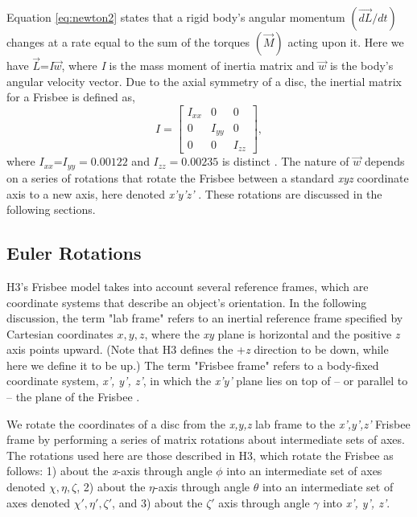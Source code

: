 \documentclass[a4paper,12pt, oneside]{article}
\begin{document}
Equation \ref{eq:newton2} states that a rigid body's angular momentum $(\vec{dL}/dt)$ changes at a rate equal to the sum of the torques $(\vec{M})$ acting upon it. Here we have $\vec{L}$=\textit{I}$\vec{w}$, where \textit{I} is the mass moment of inertia matrix and $\vec{w}$ is the body's angular velocity vector. Due to the axial symmetry of a disc, the inertial matrix for a Frisbee is defined as,  
\begin{equation*}
I=\begin{bmatrix}
I_{xx} & 0 & 0 \\
0 & I_{yy} & 0 \\ 
0 & 0 & I_{zz}
\end{bmatrix},
\end{equation*}
where $I_{xx}$=$I_{yy}=0.00122$ and $I_{zz}=0.00235$ is distinct \cite{hubbardandhummel}.  The nature of $\vec{w}$ depends on a series of rotations that rotate the Frisbee between a standard \textit{xyz} coordinate axis to a new axis, here denoted \textit{x'y'z'} \cite{H3}. These rotations are discussed in the following sections.

\subsection{Euler Rotations} 
H3's Frisbee model takes into account several reference frames, which are coordinate systems that describe an object's orientation.  In the following discussion, the term "lab frame" refers to an inertial reference frame specified by Cartesian coordinates $x,y,z$, where the \textit{xy} plane is horizontal and the positive \textit{z} axis points upward.  (Note that H3 defines the +\textit{z} direction to be down, while here we define it to be up.) The term "Frisbee frame" refers to a body-fixed coordinate system, \textit{x', y', z'}, in which the \textit{x'y'} plane lies on top of -- or parallel to -- the plane of the Frisbee \cite{hubbardandhummel, H3}. 

We rotate the coordinates of a disc from the \textit{x,y,z} lab frame to the \textit{x',y',z'} Frisbee frame by performing a series of matrix rotations about intermediate sets of axes.  The rotations used here are those described in H3, which rotate the Frisbee as follows: 1) about the \textit{x}-axis through angle $\phi$ into an intermediate set of axes denoted $\chi,\eta,\zeta$, 2) about the $\eta$-axis through angle $\theta$ into an intermediate set of axes denoted $\chi',\eta',\zeta'$, and 3) about the $\zeta'$ axis through angle $\gamma$ into \textit{x', y', z'}.
\end{document}
